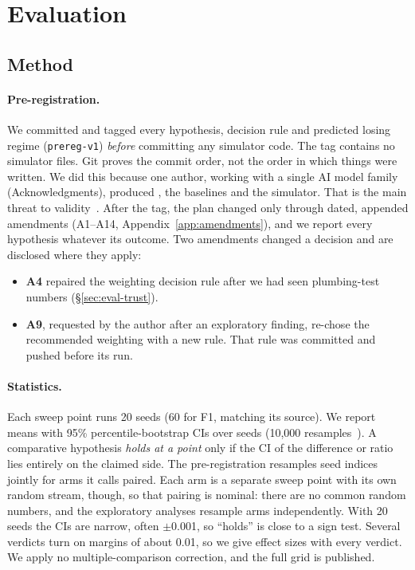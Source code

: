\section{Evaluation}
\label{sec:evaluation}

\subsection{Method}
\label{sec:eval-method}

\paragraph{Pre-registration.}
We committed and tagged every hypothesis, decision rule and predicted
losing regime (\texttt{prereg-v1}) \emph{before} committing any simulator
code. The tag contains no simulator files. Git proves the commit order,
not the order in which things were written.
We did this because one author, working with a single AI model family
(Acknowledgments), produced \sys{}, the baselines and the simulator.
That is the main threat to validity~\cite{nosek2018prereg}.
After the tag, the plan changed only through dated, appended amendments
(A1--A14, Appendix~\ref{app:amendments}), and we report every hypothesis
whatever its outcome. Two amendments changed a decision and are disclosed
where they apply:
\begin{itemize}
\item \textbf{A4} repaired the weighting decision rule after we had seen
  plumbing-test numbers (\S\ref{sec:eval-trust}).
\item \textbf{A9}, requested by the author after an exploratory finding,
  re-chose the recommended weighting with a new rule. That rule was
  committed and pushed before its run.
\end{itemize}

\paragraph{Statistics.}
Each sweep point runs 20 seeds (60 for F1, matching its source). We report
means with 95\% percentile-bootstrap CIs over seeds (10,000
resamples~\cite{efron1993bootstrap}). A comparative hypothesis
\emph{holds at a point} only if the CI of the difference or ratio lies
entirely on the claimed side. The pre-registration resamples seed
indices jointly for arms it calls paired. Each arm is a separate sweep
point with its own random stream, though, so that pairing is nominal:
there are no common random numbers, and the exploratory analyses resample
arms independently. With 20 seeds the CIs are narrow, often $\pm$0.001,
so ``holds'' is close to a sign test. Several verdicts turn on margins of
about 0.01, so we give effect sizes with every verdict. We apply no
multiple-comparison correction, and the full grid is published.


